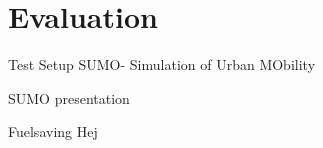

\section{Evaluation}
\begin{frame}{Test Setup}
SUMO- Simulation of Urban MObility
\end{frame}

\begin{frame}{SUMO presentation}
\end{frame}

\begin{frame}{Fuelsaving}
Hej
\end{frame}